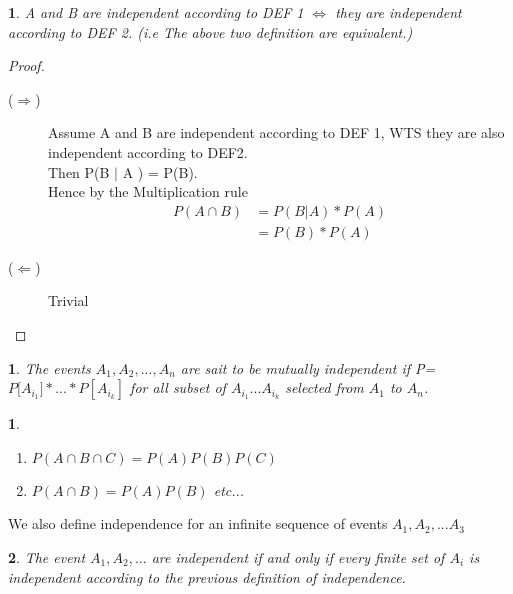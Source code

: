 \documentclass[11pt]{article}
\newtheorem{theorem}{\framebox{Thm}}[section]
\newtheorem{definition}{\framebox{DEF}}[section]
\newtheorem{example}{\framebox{Ex}}[section]
\newcommand\tab[1][1cm]{\hspace*{#1}}
\begin{document}
            \begin{theorem}
                A and B are independent according to DEF 1 $\iff $ they are independent according to DEF 2.
                (i.e The above two definition are equivalent.)
            \end{theorem}
            \begin{proof}\tab 
                \begin{description}
                    \item[($\Rightarrow$)]
                    Assume A and B are independent according to DEF 1, WTS they are also independent according to DEF2.\\
                    Then P(B $|$ A ) = P(B).\\
                    Hence by the Multiplication rule 
                    \begin{align*}
                        P(A \cap B) &= P(B | A)*P(A) \\
                                    &= P(B)*P(A)
                    \end{align*}
                    \item[($\Leftarrow$)]
                        Trivial
                \end{description}
            \end{proof}
            
            \begin{definition}
                The events $A_1, A_2,..., A_n$ are sait to be mutually independent if 
                P = $P[A_{i_1} \big]*...*P[A_{i_k}]$ for all subset of 
                $A_{i_1}...A_{i_k}$ selected from $A_1$ to $A_n$. 
            \end{definition}
            \begin{example} \tab
                \begin{enumerate}
                    \item $P(A\cap B \cap C) = P(A)P(B)P(C)$
                    \item $P(A \cap B ) = P(A) P(B)$ etc...
                \end{enumerate}
            \end{example}

            We also define independence for an infinite sequence of events $A_1,A_2,...A_3$
            \begin{definition} 
                    The event $A_1, A_2,...$ are independent if and only if every finite set of $A_i$ is independent according to the previous definition of independence.  
            \end{definition}
\end{document}
